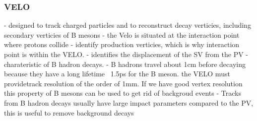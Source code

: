 \subsubsection{VELO}

- designed to track charged particles and to reconstruct decay verticies, including secondary verticies of B mesons
- the Velo is situated at the interaction point where protons collide
- identify production verticies, which is why interaction point is within the VELO.
- identifies the displacement of the SV from the PV - charateristic of B hadron decays.
- B hadrons travel about 1cm before decaying because they have a long lifetime ~1.5ps for the B meson. the VELO must providetrack resolution of the order of 1mm. If we have good vertex resolution this property of B mesons can be used to get rid of backgroud events
- Tracks from B hadron decays usually have large impact parameters compared to the PV, this is useful to remove background decays

